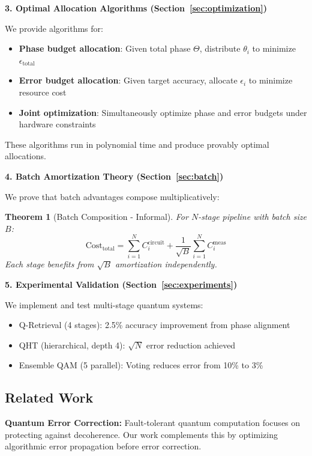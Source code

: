 \documentclass[11pt]{article}
\newtheorem{theorem}{Theorem}
\begin{document}
\textbf{3. Optimal Allocation Algorithms (Section~\ref{sec:optimization})}

We provide algorithms for:
\begin{itemize}
\item \textbf{Phase budget allocation}: Given total phase $\Theta$, distribute $\theta_i$ to minimize $\epsilon_{\text{total}}$
\item \textbf{Error budget allocation}: Given target accuracy, allocate $\epsilon_i$ to minimize resource cost
\item \textbf{Joint optimization}: Simultaneously optimize phase and error budgets under hardware constraints
\end{itemize}

These algorithms run in polynomial time and produce provably optimal allocations.

\textbf{4. Batch Amortization Theory (Section~\ref{sec:batch})}

We prove that batch advantages compose multiplicatively:

\begin{theorem}[Batch Composition - Informal]
For $N$-stage pipeline with batch size $B$:
\begin{equation}
\text{Cost}_{\text{total}} = \sum_{i=1}^N C_i^{\text{circuit}} + \frac{1}{\sqrt{B}} \sum_{i=1}^N C_i^{\text{meas}}
\end{equation}
Each stage benefits from $\sqrt{B}$ amortization independently.
\end{theorem}

\textbf{5. Experimental Validation (Section~\ref{sec:experiments})}

We implement and test multi-stage quantum systems:
\begin{itemize}
\item Q-Retrieval (4 stages): 2.5\% accuracy improvement from phase alignment
\item QHT (hierarchical, depth 4): $\sqrt{N}$ error reduction achieved
\item Ensemble QAM (5 parallel): Voting reduces error from 10\% to 3\%
\end{itemize}

\subsection{Related Work}

\textbf{Quantum Error Correction:} Fault-tolerant quantum computation \cite{shor1996fault,preskill1998fault} focuses on protecting against decoherence. Our work complements this by optimizing algorithmic error propagation before error correction.
\end{document}
